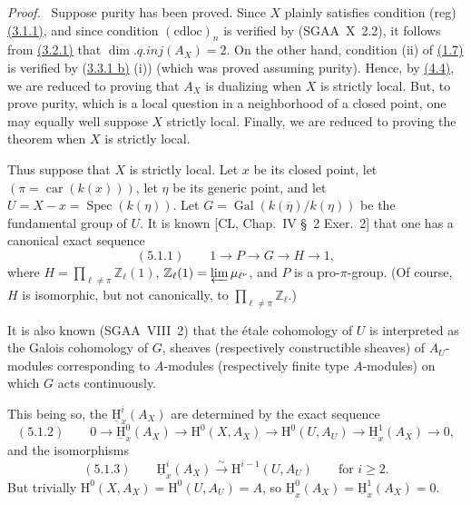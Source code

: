 \documentclass[11pt]{article}
\providecommand{\uH}{\underline{\mathrm H}}
\newenvironment{prooftext}[1][Proof]{\par\noindent\emph{#1.}\ }{\par\medskip}
\renewcommand{\H}{\mathrm{H}}
\DeclareMathOperator{\Spec}{Spec}
\newcommand{\Z}{\mathbb{Z}}
\newcommand{\ol}[1]{\overline{#1}}
\providecommand{\Gal}{\operatorname{Gal}}
\providecommand{\car}{\operatorname{car}}
\providecommand{\car}{\operatorname{car}}
\providecommand{\Z}{\mathbb Z}
\providecommand{\Spec}{\operatorname{Spec}}
\providecommand{\Spec}{\operatorname{Spec}}
\providecommand{\Spec}{\operatorname{Spec}}
\providecommand{\car}{\operatorname{car}}
\providecommand{\Spec}{\operatorname{Spec}}
\providecommand{\Gal}{\operatorname{Gal}}
\begin{document}
\begin{prooftext}[Proof]
Suppose purity has been proved. Since $X$ plainly satisfies condition (reg) \hyperref[sga5:I:statement:3.1.1]{(3.1.1)}, and since condition $(\mathrm{cdloc})_n$ is verified by (SGAA~X~2.2), it follows from \hyperref[sga5:I:proposition:3.2.1]{(3.2.1)} that $\dim.q.inj(A_X)=2$. On the other hand, condition (ii) of \hyperref[sga5:I:definition:1.7]{(1.7)} is verified by (\hyperref[sga5:I:proposition:3.3.1]{3.3.1 b)} (i)) (which was proved assuming purity). Hence, by \hyperref[sga5:I:lemma:4.4]{(4.4)}, we are reduced to proving that $A_X$ is dualizing when $X$ is strictly local. But, to prove purity, which is a local question in a neighborhood of a closed point, one may equally well suppose $X$ strictly local. Finally, we are reduced to proving the theorem when $X$ is strictly local.

Thus suppose that $X$ is strictly local. Let $x$ be its closed point, let $(\pi=\car(k(x)))$, let $\eta$ be its generic point, and let $U=X-x=\Spec(k(\eta))$. Let $G=\Gal(k(\ol{\eta})/k(\eta))$ be the fundamental group of $U$. It is known [CL, Chap.~IV \S~2 Exer.~2] that one has a canonical exact sequence
\label{sga5:I:equation:5.1.1}\[
(5.1.1)\qquad 1\longrightarrow P\longrightarrow G\longrightarrow H\longrightarrow1,
\]
where $H=\prod_{\ell\ne\pi}\Z_\ell(1)$, $\Z_\ell(1)=\varprojlim \mu_{\ell^\nu}$, and $P$ is a pro-$\pi$-group. (Of course, $H$ is isomorphic, but not canonically, to $\prod_{\ell\ne\pi}\Z_\ell$.)

It is also known (SGAA~VIII~2) that the étale cohomology of $U$ is interpreted as the Galois cohomology of $G$, sheaves (respectively constructible sheaves) of $A_U$-modules corresponding to $A$-modules (respectively finite type $A$-modules) on which $G$ acts continuously.

This being so, the $\uH_x^i(A_X)$ are determined by the exact sequence
\label{sga5:I:equation:5.1.2}\[
(5.1.2)\qquad 0\longrightarrow \uH_x^0(A_X)\longrightarrow \H^0(X,A_X)\longrightarrow \H^0(U,A_U)\longrightarrow \uH_x^1(A_X)\longrightarrow0,
\]
and the isomorphisms
\label{sga5:I:equation:5.1.3}\[
(5.1.3)\qquad \uH_x^i(A_X)\xrightarrow{\sim}\H^{i-1}(U,A_U)\qquad\text{for }i\geqslant2.
\]
But trivially $\H^0(X,A_X)=\H^0(U,A_U)=A$, so $\uH_x^0(A_X)=\uH_x^1(A_X)=0$.


\end{prooftext}
\end{document}
